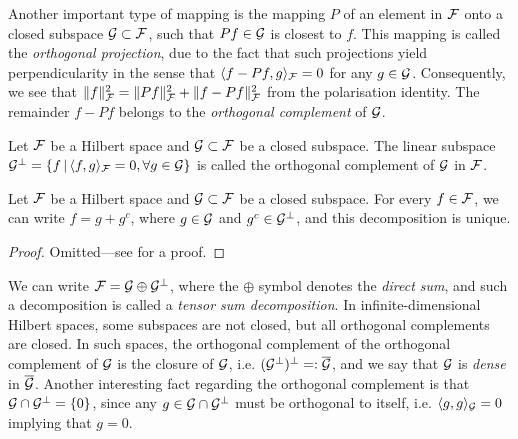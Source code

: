 \pagebreak
{}
Another important type of mapping is the mapping $P$ of an element in ${\mathcal F}$ onto a closed subspace ${\mathcal G}\subset{\mathcal F}$, such that $Pf \in {\mathcal G}$ is closest to $f$.
This mapping is called the \emph{orthogonal projection}, due to the fact that such projections yield perpendicularity in the sense that $\langle f-Pf,g\rangle_{\mathcal F} = 0$ for any $g\in{\mathcal G}$.
Consequently, we see that $\lVert f\rVert_{\mathcal F}^2 = \lVert Pf\rVert_{\mathcal F}^2 + \lVert f-Pf\rVert_{\mathcal F}^2$ from the polarisation identity.
The remainder $f - Pf$ belongs to the \emph{orthogonal complement} of ${\mathcal G}$.

\begin{definition}
  Let ${\mathcal F}$ be a Hilbert space and ${\mathcal G} \subset {\mathcal F}$ be a closed subspace.
  The linear subspace ${\mathcal G}^\bot = \{ f \,|\, \langle f,g\rangle_{\mathcal F} = 0, \forall g \in {\mathcal G} \}$ is called the orthogonal complement of ${\mathcal G}$ in ${\mathcal F}$.
\end{definition}

\begin{theorem}\label{thm:orthdecomp}
  Let ${\mathcal F}$ be a Hilbert space and ${\mathcal G} \subset {\mathcal F}$ be a closed subspace.
  For every $f \in {\mathcal F}$, we can write $f = g + g^c$, where $g \in {\mathcal G}$ and $g^c \in {\mathcal G}^\bot$, and this decomposition is unique.
\end{theorem}

\begin{proof}
  Omitted---see \citet[Theorem 4.11]{rudin1987real} for a proof.
\end{proof}

We can write ${\mathcal F} = {\mathcal G} \oplus {\mathcal G}^\bot$, where the $\oplus$ symbol denotes the \emph{direct sum}, and such a decomposition is called a \emph{tensor sum decomposition}.
In infinite-dimensional Hilbert spaces, some subspaces are not closed, but all orthogonal complements are closed. 
In such spaces, the orthogonal complement of the orthogonal complement of ${\mathcal G}$ is the closure of ${\mathcal G}$, i.e. $({\mathcal G}^\bot)^\bot =: \overline {{\mathcal G}}$, and we say that ${\mathcal G}$ is \emph{dense} in $\overline {{\mathcal G}}$.
Another interesting fact regarding the orthogonal complement is that ${\mathcal G} \cap {\mathcal G}^\bot = \{ 0 \}$, since any $g\in {\mathcal G} \cap {\mathcal G}^\bot$ must be orthogonal to itself, i.e. $\langle g,g\rangle_{\mathcal G} = 0$ implying that $g=0$.


